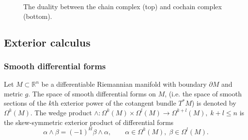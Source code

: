 \documentclass{elsarticle}
\newcommand{\bbR}{\mathbb{R}}
\begin{document}
\begin{figure}[h]
\centering
{} 
\caption{The duality between the chain complex (top) and cochain complex (bottom).}
\label{fig:cd_cochain}
\end{figure}

\subsection{Exterior calculus}

\subsubsection{Smooth differential forms}

Let $M\subset \bbR^n$ be a differentiable Riemannian manifold
with boundary $\partial M$ and metric $g$. The space of smooth differential forms on $M$, (i.e. the space of smooth sections of the $k$th exterior power of the cotangent bundle $T^* M$) is denoted by $\Omega^k(M)$. The wedge product $\wedge : \Omega^k(M) \times \Omega^l(M) \rightarrow \Omega^{k+l}(M), \; k+l \le n$ is the skew-symmetric exterior product of differential forms
\begin{equation}\label{eq:skew_wedge}
    \alpha \wedge \beta = (-1)^{kl} \beta \wedge \alpha,
    \qquad \alpha \in \Omega^k(M), \; \beta \in \Omega^l(M).
\end{equation}
\end{document}
